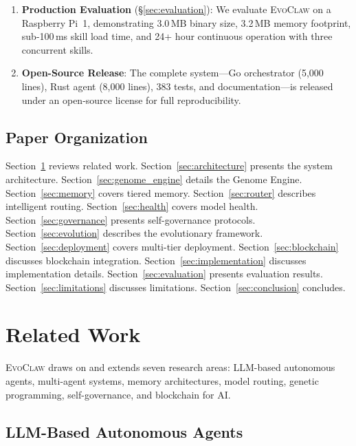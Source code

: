 \documentclass{article}
\newcommand{\evoclaw}{\textsc{EvoClaw}}
\begin{document}
\begin{enumerate}[leftmargin=*]
    \item \textbf{Production Evaluation} (\S\ref{sec:evaluation}): We evaluate \evoclaw{} on a Raspberry Pi~1, demonstrating 3.0\,MB binary size, 3.2\,MB memory footprint, sub-100\,ms skill load time, and 24+ hour continuous operation with three concurrent skills.
    
    \item \textbf{Open-Source Release}: The complete system---Go orchestrator (5,000 lines), Rust agent (8,000 lines), 383 tests, and documentation---is released under an open-source license for full reproducibility.
\end{enumerate}

\subsection{Paper Organization}

Section~\ref{sec:related} reviews related work. Section~\ref{sec:architecture} presents the system architecture. Section~\ref{sec:genome_engine} details the Genome Engine. Section~\ref{sec:memory} covers tiered memory. Section~\ref{sec:router} describes intelligent routing. Section~\ref{sec:health} covers model health. Section~\ref{sec:governance} presents self-governance protocols. Section~\ref{sec:evolution} describes the evolutionary framework. Section~\ref{sec:deployment} covers multi-tier deployment. Section~\ref{sec:blockchain} discusses blockchain integration. Section~\ref{sec:implementation} discusses implementation details. Section~\ref{sec:evaluation} presents evaluation results. Section~\ref{sec:limitations} discusses limitations. Section~\ref{sec:conclusion} concludes.


\section{Related Work}
\label{sec:related}

\evoclaw{} draws on and extends seven research areas: LLM-based autonomous agents, multi-agent systems, memory architectures, model routing, genetic programming, self-governance, and blockchain for AI.

\subsection{LLM-Based Autonomous Agents}
\end{document}
